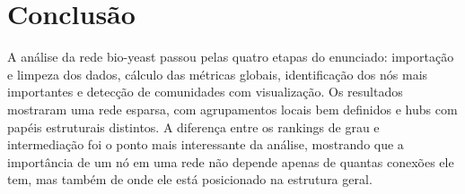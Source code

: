 \documentclass[12pt,a4paper]{article}
\begin{document}
\section{Conclusão}

A análise da rede bio-yeast passou pelas quatro etapas do enunciado: importação e limpeza dos dados, cálculo das métricas globais, identificação dos nós mais importantes e detecção de comunidades com visualização. Os resultados mostraram uma rede esparsa, com agrupamentos locais bem definidos e hubs com papéis estruturais distintos. A diferença entre os rankings de grau e intermediação foi o ponto mais interessante da análise, mostrando que a importância de um nó em uma rede não depende apenas de quantas conexões ele tem, mas também de onde ele está posicionado na estrutura geral.
\end{document}
